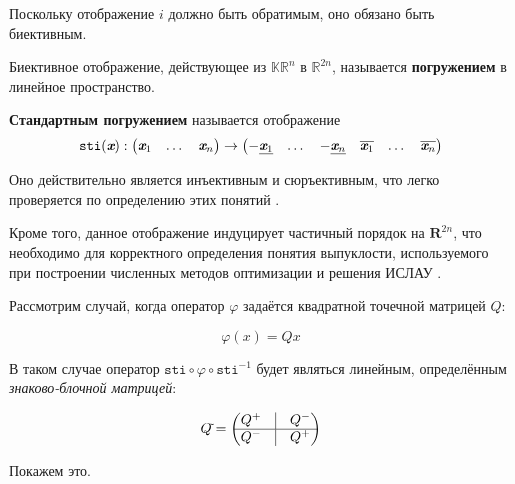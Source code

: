 Поскольку отображение $i$ должно быть обратимым, оно обязано быть биективным.

\begin{definition}
	Биективное отображение, действующее из $\mathbb{KR}^{n}$ в $\mathbb{R}^{2n}$, называется \textbf{погружением} в линейное пространство.
\end{definition}

\begin{definition}
\textbf{Стандартным погружением} называется отображение
\begin{equation}
\mathtt{sti}(\textit{\textbf{x}}): 
\begin{pmatrix}
\textit{\textbf{x}}_1 & \dots & \textit{\textbf{x}}_n
\end{pmatrix}
\rightarrow
\begin{pmatrix}
-\underline{\textit{\textbf{x}}_1} & \dots & -\underline{\textit{\textbf{x}}_n} & 
\overline{\textit{\textbf{x}}_1} & \dots &
\overline{\textit{\textbf{x}}_n}
\end{pmatrix}
\end{equation}
\end{definition}

Оно действительно является инъективным и сюръективным, что легко проверяется по определению этих понятий \cite[Лекция 11]{intv}.

Кроме того, данное отображение индуцирует частичный порядок на $\mathbf{R}^{2n}$, что необходимо для корректного определения понятия выпуклости, используемого при построении численных методов оптимизации и решения ИСЛАУ \cite[стр. 580]{shary}.

Рассмотрим случай, когда оператор $\varphi$ задаётся квадратной точечной матрицей $Q$:

\begin{equation}
\varphi(x)=Qx
\end{equation}

В таком случае оператор $\mathtt{sti} \circ \varphi \circ \mathtt{sti}^{-1}$ будет являться линейным, определённым \textit{знаково-блочной матрицей}:

\begin{equation}
Q\tilde{} =
\begin{pmatrix}
Q^+ & \vrule & Q^- \\
\hline
Q^- & \vrule & Q^+
\end{pmatrix}
\end{equation}

Покажем это.

